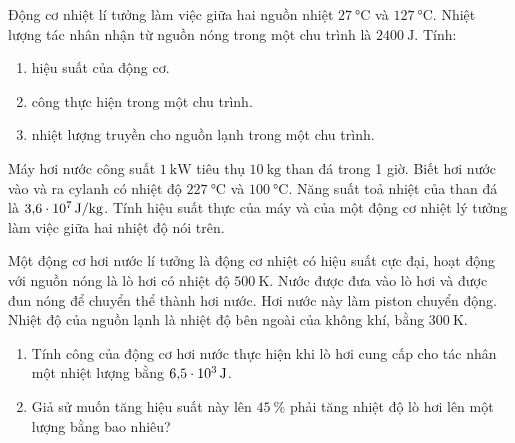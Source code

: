 \begin{ex}
	Động cơ nhiệt lí tưởng làm việc giữa hai nguồn nhiệt $\SI{27}{\celsius}$ và $\SI{127}{\celsius}$. Nhiệt lượng tác nhân nhận từ nguồn nóng trong một chu trình là $\SI{2400}{\joule}$. Tính:
	\begin{enumerate}[label=\alph*)]
		\item hiệu suất của động cơ.
		\item công thực hiện trong một chu trình.
		\item nhiệt lượng truyền cho nguồn lạnh trong một chu trình.
	\end{enumerate}
	
\end{ex}
\begin{ex}
	Máy hơi nước công suất $\SI{1}{\kilo\watt}$ tiêu thụ $\SI{10}{\kilogram}$ than đá trong 1 giờ. Biết hơi nước vào và ra cylanh có nhiệt độ $\SI{227}{\celsius}$ và $\SI{100}{\celsius}$. Năng suất toả nhiệt của than đá là $\SI{3.6E7}{\joule/\kilogram}$. Tính hiệu suất thực của máy và của một động cơ nhiệt lý tưởng làm việc giữa hai nhiệt độ nói trên.
	
\end{ex}
\begin{ex}
	Một động cơ hơi nước lí tưởng là động cơ nhiệt có hiệu suất cực đại, hoạt động với nguồn nóng là lò hơi có nhiệt độ $\SI{500}{\kelvin}$. Nước được đưa vào lò hơi và được đun nóng để chuyển thể thành hơi nước. Hơi nước này làm piston chuyển động. Nhiệt độ của nguồn lạnh là nhiệt độ bên ngoài của không khí, bằng $\SI{300}{\kelvin}$.
	\begin{enumerate}[label=\alph*)]
		\item Tính công của động cơ hơi nước thực hiện khi lò hơi cung cấp cho tác nhân một nhiệt lượng bằng $\SI{6.5E3}{\joule}$.
		\item Giả sử muốn tăng hiệu suất này lên $\SI{45}{\percent}$ phải tăng nhiệt độ lò hơi lên một lượng bằng bao nhiêu?
	\end{enumerate}
	
\end{ex}
